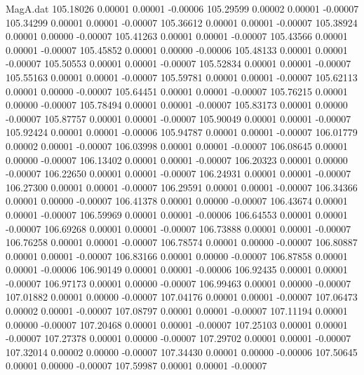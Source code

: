 \begin{filecontents}{MagA.dat}
 105.18026    0.00001    0.00001   -0.00006
 105.29599    0.00002    0.00001   -0.00007
 105.34299    0.00001    0.00001   -0.00007
 105.36612    0.00001    0.00001   -0.00007
 105.38924    0.00001    0.00000   -0.00007
 105.41263    0.00001    0.00001   -0.00007
 105.43566    0.00001    0.00001   -0.00007
 105.45852    0.00001    0.00000   -0.00006
 105.48133    0.00001    0.00001   -0.00007
 105.50553    0.00001    0.00001   -0.00007
 105.52834    0.00001    0.00001   -0.00007
 105.55163    0.00001    0.00001   -0.00007
 105.59781    0.00001    0.00001   -0.00007
 105.62113    0.00001    0.00000   -0.00007
 105.64451    0.00001    0.00001   -0.00007
 105.76215    0.00001    0.00000   -0.00007
 105.78494    0.00001    0.00001   -0.00007
 105.83173    0.00001    0.00000   -0.00007
 105.87757    0.00001    0.00001   -0.00007
 105.90049    0.00001    0.00001   -0.00007
 105.92424    0.00001    0.00001   -0.00006
 105.94787    0.00001    0.00001   -0.00007
 106.01779    0.00002    0.00001   -0.00007
 106.03998    0.00001    0.00001   -0.00007
 106.08645    0.00001    0.00000   -0.00007
 106.13402    0.00001    0.00001   -0.00007
 106.20323    0.00001    0.00000   -0.00007
 106.22650    0.00001    0.00001   -0.00007
 106.24931    0.00001    0.00001   -0.00007
 106.27300    0.00001    0.00001   -0.00007
 106.29591    0.00001    0.00001   -0.00007
 106.34366    0.00001    0.00000   -0.00007
 106.41378    0.00001    0.00000   -0.00007
 106.43674    0.00001    0.00001   -0.00007
 106.59969    0.00001    0.00001   -0.00006
 106.64553    0.00001    0.00001   -0.00007
 106.69268    0.00001    0.00001   -0.00007
 106.73888    0.00001    0.00001   -0.00007
 106.76258    0.00001    0.00001   -0.00007
 106.78574    0.00001    0.00000   -0.00007
 106.80887    0.00001    0.00001   -0.00007
 106.83166    0.00001    0.00000   -0.00007
 106.87858    0.00001    0.00001   -0.00006
 106.90149    0.00001    0.00001   -0.00006
 106.92435    0.00001    0.00001   -0.00007
 106.97173    0.00001    0.00000   -0.00007
 106.99463    0.00001    0.00000   -0.00007
 107.01882    0.00001    0.00000   -0.00007
 107.04176    0.00001    0.00001   -0.00007
 107.06473    0.00002    0.00001   -0.00007
 107.08797    0.00001    0.00001   -0.00007
 107.11194    0.00001    0.00000   -0.00007
 107.20468    0.00001    0.00001   -0.00007
 107.25103    0.00001    0.00001   -0.00007
 107.27378    0.00001    0.00000   -0.00007
 107.29702    0.00001    0.00001   -0.00007
 107.32014    0.00002    0.00000   -0.00007
 107.34430    0.00001    0.00000   -0.00006
 107.50645    0.00001    0.00000   -0.00007
 107.59987    0.00001    0.00001   -0.00007

\end{filecontents}

